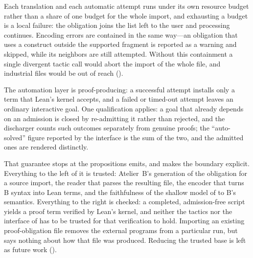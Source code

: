 Each translation and each automatic attempt runs under its own resource budget rather than
a share of one budget for the whole import, and exhausting a budget is a local failure: the
obligation joins the list left to the user and processing continues.
Encoding errors are contained in the same way---an obligation that uses a construct outside
the supported fragment is reported as a warning and skipped, while its neighbors are still
attempted.
Without this containment a single divergent tactic call would abort the import of the
whole file, and industrial files would be out of reach
().

The automation layer is proof-producing: a successful attempt installs only a term that
Lean's kernel accepts, and a failed or timed-out attempt leaves an ordinary interactive
goal.
One qualification applies: a goal that already depends on an admission is closed by
re-admitting it rather than rejected, and the discharger counts such outcomes separately
from genuine proofs; the
``auto-solved'' figure reported by the interface is the sum of the two, and the admitted
ones are rendered distinctly.

That guarantee stops at the propositions \barrel{} emits, and
 makes the boundary explicit.
Everything to the left of it is trusted: Atelier~B's generation of the obligation for a
source import, the reader that parses the resulting file, the encoder that turns B syntax
into Lean terms, and the faithfulness of the shallow model of 
to B's semantics.
Everything to the right is checked: a completed, admission-free script yields a proof term
verified by Lean's kernel, and neither the tactics nor the interface of
 has to be trusted for that verification to hold.
Importing an existing proof-obligation file removes the external programs from a particular
run, but says nothing about how that file was produced.
Reducing the trusted base is left as future work
().

